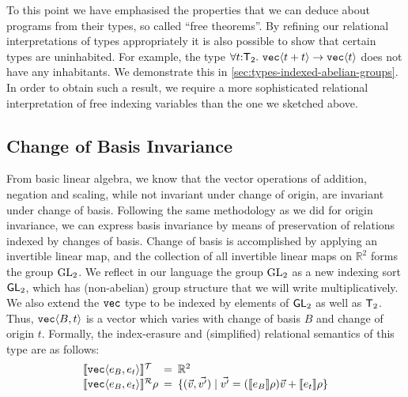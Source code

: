 \begin{example}\label{ex:uninhabited-type}
  To this point we have emphasised the properties that we can deduce
  about programs from their types, so called ``free theorems''. By
  refining our relational interpretations of types appropriately it is
  also possible to show that certain types are uninhabited. For
  example, the type $\forall t \mathord: \mathsf{T}_2.\ \texttt{vec}\langle t
    + t \rangle \to \texttt{vec}\langle t \rangle$ does not have any inhabitants. We
  demonstrate this in \autoref{sec:types-indexed-abelian-groups}. In
  order to obtain such a result, we require a more sophisticated
  relational interpretation of free indexing variables than the one we
  sketched above.
\end{example}

\subsection{Change of Basis Invariance}
\label{sec:motivation-generalising}

From basic linear algebra, we know that the vector operations of
addition, negation and scaling, while not invariant under change of
origin, are invariant under change of basis. Following the same
methodology as we did for origin invariance, we can express basis
invariance by means of preservation of relations indexed by changes of
basis. Change of basis is accomplished by applying an invertible
linear map, and the collection of all invertible linear maps on
$\mathbb{R}^2$ forms the group $\mathrm{GL}_2$. We reflect in our language the
group $\mathrm{GL}_2$ as a new indexing sort $\mathsf{GL}_2$, which has
(non-abelian) group structure that we will write multiplicatively. We
also extend the $\texttt{vec}$ type to be indexed by elements of
$\mathsf{GL}_2$ as well as $\mathsf{T}_2$. Thus, $\texttt{vec}\langle B,t \rangle$ is a
vector which varies with change of basis $B$ and change of origin
$t$. Formally, the index-erasure and (simplified) relational semantics
of this type are as follows:
\begin{displaymath}
  \begin{array}{l@{\hspace{0.5em}=\hspace{0.5em}}l}
    \tySem{\tyPrim{vec}{e_B,e_t}} & \mathbb{R}^2 \\
    \rsem{\tyPrim{vec}{e_B,e_t}}{}\rho & \{ (\vec{v},\vec{v'}) \sepbar \vec{v'} = (\sem{e_B}\rho)\vec{v} + \sem{e_t}\rho \}
  \end{array}
\end{displaymath}

